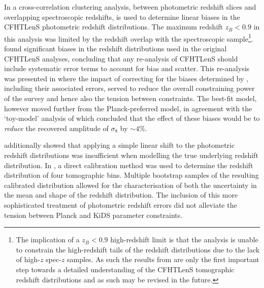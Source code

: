 In \citet{choi/etal:2016} a cross-correlation clustering analysis, between photometric redshift slices and overlapping spectroscopic redshifts, is used to determine linear biases in the CFHTLenS photometric redshift distributions.   The maximum redshift $z_B<0.9$ in this analysis was limited by the redshift overlap with the spectroscopic sample\footnote{The implication of a $z_B < 0.9$ high-redshift limit is that the analysis is unable to constrain the high-redshift tails of the redshift distributions due to the lack of high-$z$ spec-$z$ samples. As such the results from \citet{choi/etal:2016} are only the first important step towards a detailed understanding of the CFHTLenS tomographic redshift distributions and as such may be revised in the future.}.  \citet{choi/etal:2016} found significant biases in the redshift distributions used in the original CFHTLenS analyses,
concluding that any re-analysis of CFHTLenS should include systematic error terms to account for bias and scatter.    This re-analysis was presented in \citet{joudaki/etal:2016} where the impact of correcting for the biases determined by \citet{choi/etal:2016}, including their associated errors, served to reduce the overall constraining power of the survey and hence also the tension between constraints.  The best-fit model, however moved further from the Planck-preferred model, in agreement with the `toy-model' analysis of \citet{choi/etal:2016} which concluded that the effect of these biases would be to {\it reduce} the recovered amplitude of $\sigma_8$ by $\sim 4$\%. 

\citet{choi/etal:2016} additionally showed that applying a simple linear shift to the photometric redshift distributions was insufficient when modelling the true underlying redshift distribution.  In \citet{hildebrandt/etal:2016}, a direct calibration method was used to determine the redshift distribution of four tomographic bins.  Multiple bootstrap samples of the resulting calibrated distribution allowed for the characterisation of both the uncertainty in the mean and shape of the redshift distribution.  The inclusion of this more sophisticated treatment of photometric redshift errors did not alleviate the tension between Planck and KiDS parameter constraints.

